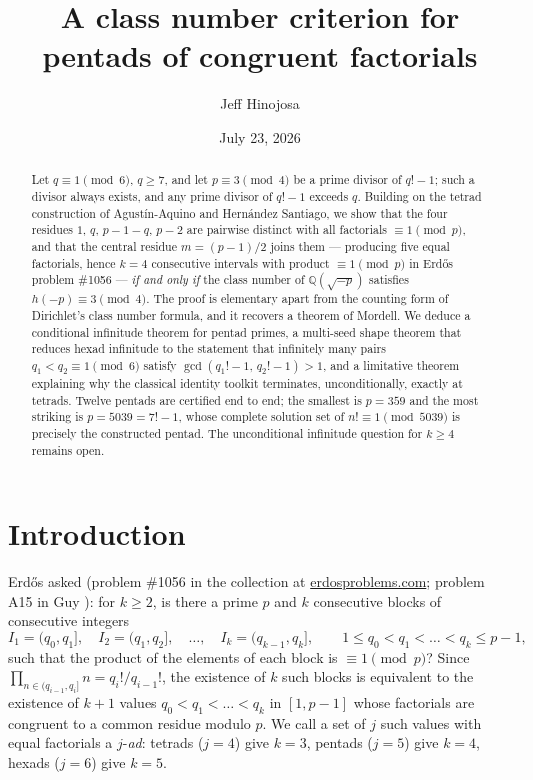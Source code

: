 \documentclass[11pt]{article}
\title{A class number criterion for pentads of congruent factorials}
\author{Jeff Hinojosa}
\date{July 23, 2026}
\theoremstyle{definition}
\theoremstyle{remark}
\newcommand{\Q}{\mathbb{Q}}
\begin{document}
\maketitle

{\let\thefootnote\relax{}}

\begin{abstract}
Let $q \equiv 1 \pmod 6$, $q \ge 7$, and let $p \equiv 3 \pmod 4$ be a prime
divisor of $q!-1$; such a divisor always exists, and any prime divisor of
$q!-1$ exceeds $q$. Building on the tetrad construction of
Agust\'in-Aquino and Hern\'andez Santiago, we show that the four residues
$1$, $q$, $p-1-q$, $p-2$ are pairwise distinct with all factorials
$\equiv 1 \pmod p$, and that the central residue $m = (p-1)/2$ joins them ---
producing five equal factorials, hence $k = 4$ consecutive intervals with
product $\equiv 1 \pmod p$ in Erd\H{o}s problem \#1056 --- \emph{if and only
if} the class number of $\Q(\sqrt{-p})$ satisfies $h(-p) \equiv 3 \pmod 4$.
The proof is elementary apart from the counting form of Dirichlet's class
number formula, and it recovers a theorem of Mordell. We deduce a conditional
infinitude theorem for pentad primes, a multi-seed shape theorem that reduces
hexad infinitude to the statement that infinitely many pairs
$q_1 < q_2 \equiv 1 \pmod 6$ satisfy $\gcd(q_1!-1,\,q_2!-1) > 1$, and a
limitative theorem explaining why the classical identity toolkit terminates,
unconditionally, exactly at tetrads. Twelve pentads are certified end to end;
the smallest is $p = 359$ and the most striking is $p = 5039 = 7!-1$, whose
complete solution set of $n! \equiv 1 \pmod{5039}$ is precisely the
constructed pentad. The unconditional infinitude question for $k \ge 4$
remains open.
\end{abstract}

\section{Introduction}\label{sec:intro}

Erd\H{o}s asked (problem \#1056 in the collection at
\href{https://www.erdosproblems.com/1056}{erdosproblems.com}; problem A15 in
Guy \cite{Guy}): for $k \ge 2$, is there a prime $p$ and $k$ consecutive
blocks of consecutive integers
\[
  I_1 = (q_0, q_1], \quad I_2 = (q_1, q_2], \quad \dots, \quad
  I_k = (q_{k-1}, q_k], \qquad 1 \le q_0 < q_1 < \dots < q_k \le p-1,
\]
such that the product of the elements of each block is $\equiv 1 \pmod p$?
Since $\prod_{n \in (q_{i-1}, q_i]} n = q_i!/q_{i-1}!$, the existence of $k$
such blocks is equivalent to the existence of $k+1$ values
$q_0 < q_1 < \dots < q_k$ in $[1, p-1]$ whose factorials are congruent to a
common residue modulo $p$. We call a set of $j$ such values with equal
factorials a $j$-\emph{ad}: tetrads ($j=4$) give $k=3$, pentads ($j=5$) give
$k=4$, hexads ($j=6$) give $k=5$.
\end{document}
